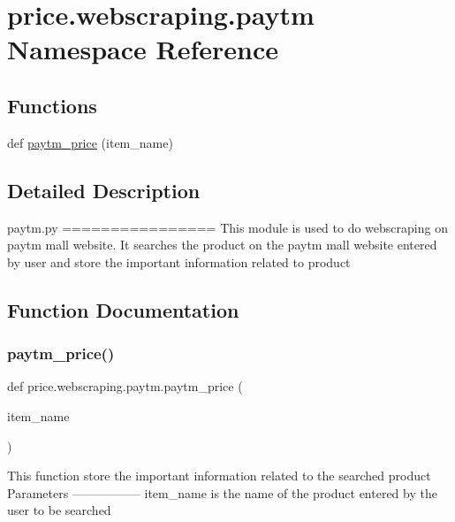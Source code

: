 \hypertarget{namespaceprice_1_1webscraping_1_1paytm}{}\section{price.\+webscraping.\+paytm Namespace Reference}
\label{namespaceprice_1_1webscraping_1_1paytm}
\subsection*{Functions}
\begin{DoxyCompactItemize}
\item 
def \hyperlink{namespaceprice_1_1webscraping_1_1paytm_ae4522bee03019b9e048877e34bb7ca59}{paytm\+\_\+price} (item\+\_\+name)
\end{DoxyCompactItemize}


\subsection{Detailed Description}
\begin{DoxyVerb}paytm.py
================
This module is used to do webscraping on paytm mall website. It searches the product on the paytm mall website entered by user and store the important information related to product
\end{DoxyVerb}
 

\subsection{Function Documentation}
\mbox{\label{namespaceprice_1_1webscraping_1_1paytm_ae4522bee03019b9e048877e34bb7ca59}} 
\subsubsection{\texorpdfstring{paytm\+\_\+price()}{paytm\_price()}}
{\footnotesize\ttfamily def price.\+webscraping.\+paytm.\+paytm\+\_\+price (\begin{DoxyParamCaption}\item[{}]{item\+\_\+name }\end{DoxyParamCaption})}

\begin{DoxyVerb}This function store the important information related to the searched product
Parameters
-----------------
item_name is the name of the product entered by the user to be searched
\end{DoxyVerb}
 